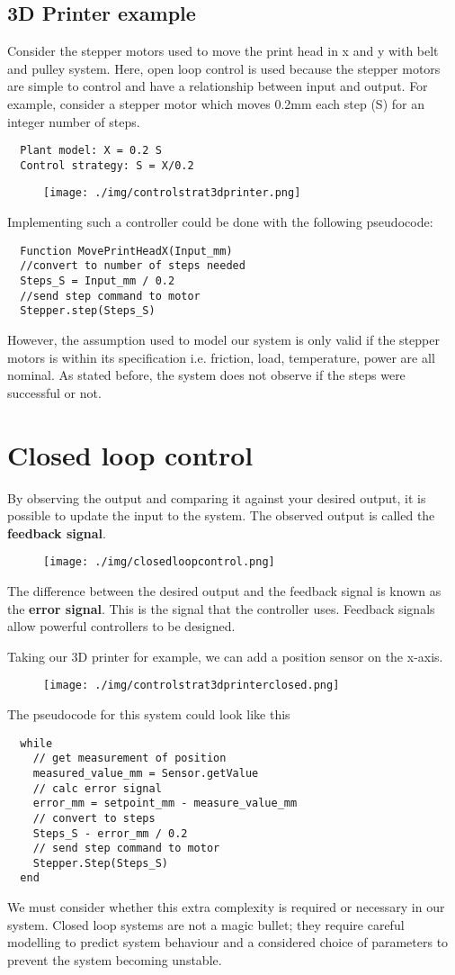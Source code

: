 \subsection*{3D Printer example}
Consider the stepper motors used to move the print head in x and y with belt and pulley system. Here, open loop control is used because the stepper motors are simple to control and have a relationship between input and output. For example, consider a stepper motor which moves 0.2\si{\milli\m} each step (S) for an integer number of steps.
\begin{verbatim}
  Plant model: X = 0.2 S
  Control strategy: S = X/0.2
\end{verbatim}
\begin{figure}[H]
  \centering
  \texttt{[image: ./img/controlstrat3dprinter.png]}
\end{figure}
Implementing such a controller could be done with the following pseudocode:
\begin{verbatim}
  Function MovePrintHeadX(Input_mm)
  //convert to number of steps needed
  Steps_S = Input_mm / 0.2
  //send step command to motor
  Stepper.step(Steps_S)
\end{verbatim}
However, the assumption used to model our system is only valid if the stepper motors is within its specification i.e. friction, load, temperature, power are all nominal. As stated before, the system does not observe if the steps were successful or not.
\section{Closed loop control}
By observing the output and comparing it against your desired output, it is possible to update the input to the system. The observed output is called the \textbf{feedback signal}.
\begin{figure}[H]
  \centering
  \texttt{[image: ./img/closedloopcontrol.png]}
\end{figure}
The difference between the desired output and the feedback signal is known as the \textbf{error signal}. This is the signal that the controller uses. Feedback signals allow powerful controllers to be designed.

Taking our 3D printer for example, we can add a position sensor on the x-axis.
\begin{figure}[H]
  \centering
  \texttt{[image: ./img/controlstrat3dprinterclosed.png]}
\end{figure}
The pseudocode for this system could look like this
\begin{verbatim}
  while
    // get measurement of position
    measured_value_mm = Sensor.getValue
    // calc error signal
    error_mm = setpoint_mm - measure_value_mm
    // convert to steps
    Steps_S - error_mm / 0.2
    // send step command to motor
    Stepper.Step(Steps_S)
  end
\end{verbatim}
We must consider whether this extra complexity is required or necessary in our system. Closed loop systems are not a magic bullet; they require careful modelling to predict system behaviour and a considered choice of parameters to prevent the system becoming unstable.

